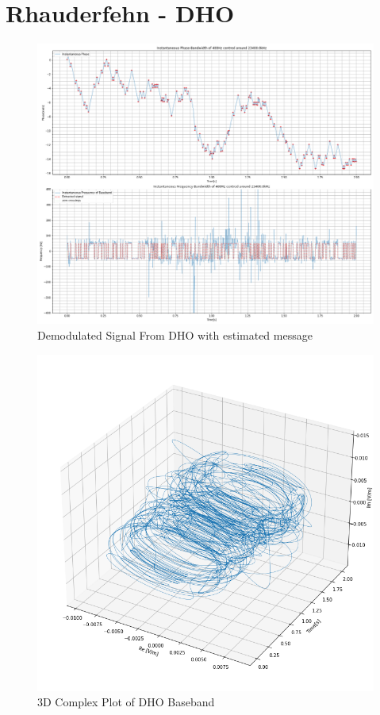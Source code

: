 \section{Rhauderfehn - \textbf{DHO}}
\begin{figure}[H]
    \centering
    \includegraphics[width = \textwidth]{figs/AppA/DHO.png}
    \caption{Demodulated Signal From DHO with estimated message}
    \label{fig:my_label}
\end{figure}
\begin{figure}[H]
    \centering
    \includegraphics[width = \textwidth]{figs/AppA/dho3D.png}
    \caption{3D Complex Plot of DHO Baseband}
    \label{fig:my_label}
\end{figure}

